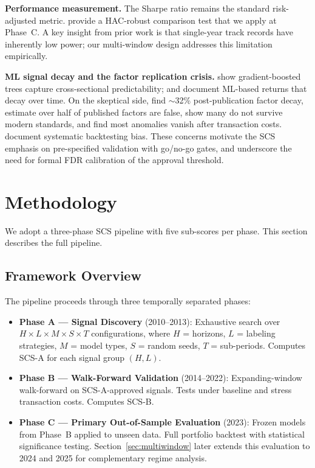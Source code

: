 \documentclass[12pt,a4paper]{article}
\begin{document}
\textbf{Performance measurement.} The Sharpe ratio \citep{sharpe1994sharpe} remains the standard risk-adjusted metric. \citet{ledoit2008robust} provide a HAC-robust comparison test that we apply at Phase~C. A key insight from prior work is that single-year track records have inherently low power; our multi-window design addresses this limitation empirically.

\textbf{ML signal decay and the factor replication crisis.} \citet{gu2020empirical} show gradient-boosted trees capture cross-sectional predictability; \citet{krauss2017deep} and \citet{fischer2018deep} document ML-based returns that decay over time. On the skeptical side, \citet{mclean2016does} find $\sim$32\% post-publication factor decay, \citet{harvey2020false} estimate over half of published factors are false, \citet{chen2022open} show many do not survive modern standards, and \citet{chordia2020anomalies} find most anomalies vanish after transaction costs. \citet{arnott2019backtesting} document systematic backtesting bias. These concerns motivate the SCS emphasis on pre-specified validation with go/no-go gates, and underscore the need for formal FDR calibration of the approval threshold.


\section{Methodology}
\label{sec:methodology}

We adopt a three-phase SCS pipeline with five sub-scores per phase. This section describes the full pipeline.

\subsection{Framework Overview}

The pipeline proceeds through three temporally separated phases:

\begin{itemize}
  \item \textbf{Phase A --- Signal Discovery} (2010--2013): Exhaustive search over $H \times L \times M \times S \times T$ configurations, where $H$ = horizons, $L$ = labeling strategies, $M$ = model types, $S$ = random seeds, $T$ = sub-periods. Computes SCS-A for each signal group $(H, L)$.
  \item \textbf{Phase B --- Walk-Forward Validation} (2014--2022): Expanding-window walk-forward on SCS-A-approved signals. Tests under baseline and stress transaction costs. Computes SCS-B.
  \item \textbf{Phase C --- Primary Out-of-Sample Evaluation} (2023): Frozen models from Phase~B applied to unseen data. Full portfolio backtest with statistical significance testing. Section~\ref{sec:multiwindow} later extends this evaluation to 2024 and 2025 for complementary regime analysis.
\end{itemize}
\end{document}
